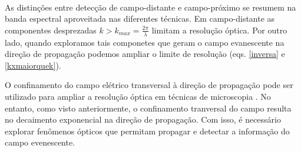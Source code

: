 \paragraph{}
As distinções entre detecção de campo-distante e campo-próximo se resumem na banda espectral aproveitada nas diferentes técnicas. Em campo-distante as componentes desprezadas $k>k_{max}=\frac{2\pi}{\lambda}$ limitam a resolução óptica. Por outro lado, quando exploramos tais componetes que geram o campo evanescente na direção de propagação podemos ampliar o limite de resolução (eqs. \ref{inversa} e \ref{kxmaiorquek}).   

O confinamento do campo elétrico transversal à direção de propagação pode ser utilizado para ampliar a resolução óptica em técnicas de microscopia \cite{novotny,ropers,nature}. No entanto, como visto anteriormente, o confinamento tranversal do campo resulta no decaimento exponencial na direção de propagação. Com isso, é necessário explorar fenômenos ópticos que permitam propagar e detectar a informação do campo evenescente.

